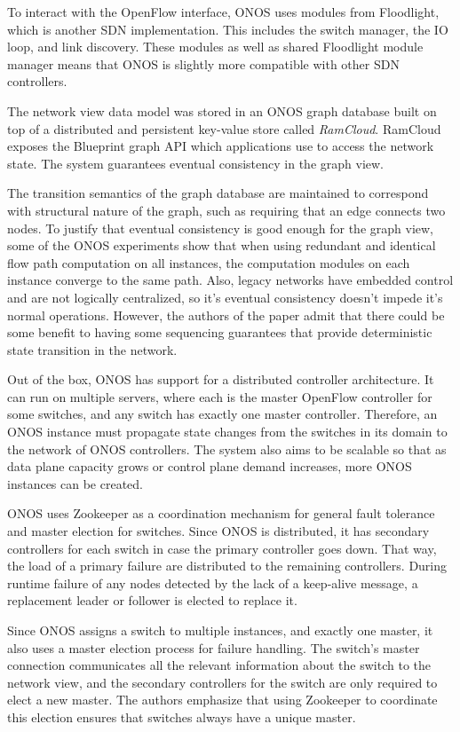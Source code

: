 \documentclass[letterpaper,twocolumn,10pt]{article}
\begin{document}
To interact with the OpenFlow interface, ONOS uses modules from Floodlight, which is another SDN implementation. This includes the switch manager, the IO loop, and link discovery. These modules as well as shared Floodlight module manager means that ONOS is slightly more compatible with other SDN controllers.

The network view data model was stored in an ONOS graph database built on top of a distributed and persistent key-value store called \emph{RamCloud}. RamCloud exposes the Blueprint graph API which applications use to access the network state. The system guarantees eventual consistency in the graph view.\cite{berde2014onos} 

The transition semantics of the graph database are maintained to correspond with structural nature of the graph, such as requiring that an edge connects two nodes. To justify that eventual consistency is good enough for the graph view, some of the ONOS experiments show that when using redundant and identical flow path computation on all instances, the computation modules on each instance converge to the same path. Also, legacy networks have embedded control and are not logically centralized, so it's eventual consistency doesn't impede it's normal operations. However, the authors of the paper admit that there could be some benefit to having some sequencing guarantees that provide deterministic state transition in the network.

Out of the box, ONOS has support for a distributed controller architecture. It can run on multiple servers, where each is the master OpenFlow controller for some switches, and any switch has exactly one master controller. Therefore, an ONOS instance must propagate state changes from the switches in its domain to the network of ONOS controllers. The system also aims to be scalable so that as data plane capacity grows or control plane demand increases, more ONOS instances can be created.

ONOS uses Zookeeper as a coordination mechanism for general fault tolerance and master election for switches. Since ONOS is distributed, it has secondary controllers for each switch in case the primary controller goes down. That way, the load of a primary failure are distributed to the remaining controllers. During runtime failure of any nodes detected by the lack of a keep-alive message, a replacement leader or follower is elected to replace it.

Since ONOS assigns a switch to multiple instances, and exactly one master, it also uses a master election process for failure handling. The switch's master connection communicates all the relevant information about the switch to the network view, and the secondary controllers for the switch are only required to elect a new master. The authors emphasize that using Zookeeper to coordinate this election ensures that switches always have a unique master. 
\end{document}

